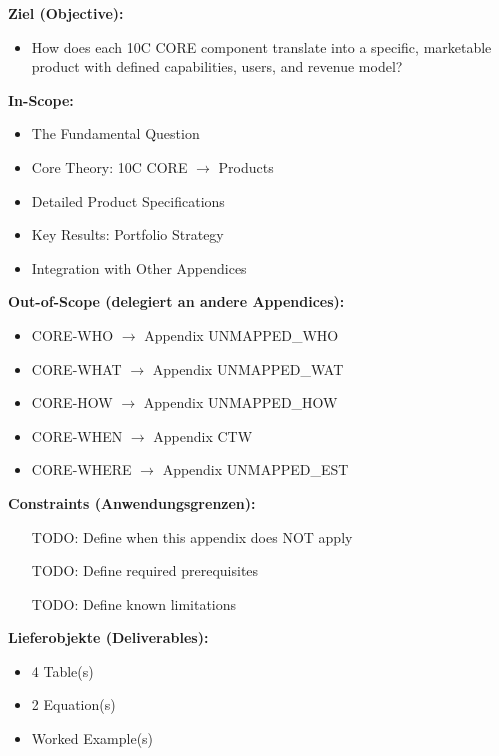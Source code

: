 \begin{tcolorbox}[
    colback=orange!5!white,
    colframe=orange!75!black,
    title={\textbf{Appendix Scope: Ziel / In-Scope / Out-of-Scope / Constraints}},
    fonttitle=\bfseries
]

\textbf{Ziel (Objective):}
\begin{itemize}[nosep]
    \item How does each 10C CORE component translate into a specific, marketable product with defined capabilities, users, and revenue model?
\end{itemize}

\textbf{In-Scope:}
\begin{itemize}[nosep]
    \item The Fundamental Question
    \item Core Theory: 10C CORE $\to$ Products
    \item Detailed Product Specifications
    \item Key Results: Portfolio Strategy
    \item Integration with Other Appendices
\end{itemize}

\textbf{Out-of-Scope (delegiert an andere Appendices):}
\begin{itemize}[nosep]
    \item CORE-WHO $\rightarrow$ Appendix UNMAPPED_WHO
    \item CORE-WHAT $\rightarrow$ Appendix UNMAPPED_WAT
    \item CORE-HOW $\rightarrow$ Appendix UNMAPPED_HOW
    \item CORE-WHEN $\rightarrow$ Appendix CTW
    \item CORE-WHERE $\rightarrow$ Appendix UNMAPPED_EST
\end{itemize}

\textbf{Constraints (Anwendungsgrenzen):}
\begin{itemize}[nosep]
    \item [TODO: Define when this appendix does NOT apply]
    \item [TODO: Define required prerequisites]
    \item [TODO: Define known limitations]
\end{itemize}

\textbf{Lieferobjekte (Deliverables):}
\begin{itemize}[nosep]
    \item 4 Table(s)
    \item 2 Equation(s)
    \item Worked Example(s)
\end{itemize}

\end{tcolorbox}




